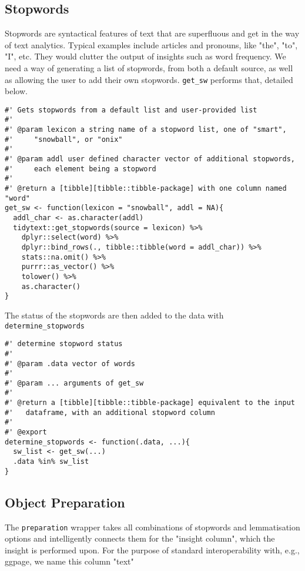 \documentclass[a4paper, 11pt]{article}
\begin{document}
\subsection{Stopwords}
\label{sec:org3bd2908}
Stopwords are syntactical features of text that are superfluous and
get in the way of text analytics. Typical examples include articles
and pronouns, like "the", "to", "I", etc. They would clutter the
output of insights such as word frequency. We need a way of generating
a list of stopwords, from both a default source, as well as allowing
the user to add their own stopwords. \texttt{get\_sw} performs that, detailed
below.
\begin{verbatim}
#' Gets stopwords from a default list and user-provided list
#'
#' @param lexicon a string name of a stopword list, one of "smart",
#'     "snowball", or "onix"
#'
#' @param addl user defined character vector of additional stopwords,
#'     each element being a stopword
#'
#' @return a [tibble][tibble::tibble-package] with one column named "word"
get_sw <- function(lexicon = "snowball", addl = NA){
  addl_char <- as.character(addl)
  tidytext::get_stopwords(source = lexicon) %>%
    dplyr::select(word) %>%
    dplyr::bind_rows(., tibble::tibble(word = addl_char)) %>%
    stats::na.omit() %>%
    purrr::as_vector() %>%
    tolower() %>%
    as.character()
}
\end{verbatim}
The status of the stopwords are then added to the data with \texttt{determine\_stopwords}
\begin{verbatim}
#' determine stopword status
#'
#' @param .data vector of words
#'
#' @param ... arguments of get_sw
#'
#' @return a [tibble][tibble::tibble-package] equivalent to the input
#'   dataframe, with an additional stopword column
#'
#' @export
determine_stopwords <- function(.data, ...){
  sw_list <- get_sw(...)
  .data %in% sw_list
}
\end{verbatim}
\subsection{Object Preparation}
\label{sec:org1fb0366}
The \texttt{preparation} wrapper takes all combinations of stopwords and
lemmatisation options and intelligently connects them for the "insight
column", which the insight is performed upon. For the purpose of
standard interoperability with, e.g., ggpage, we name this column
"text"
\end{document}
